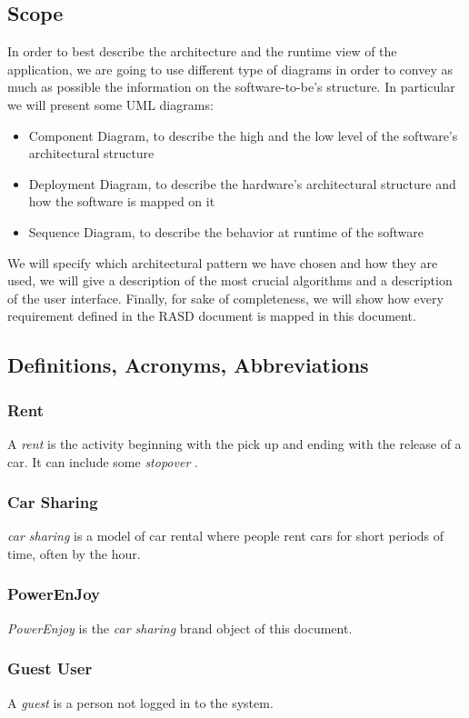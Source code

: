\documentclass[english]{article}
\newcommand{\rent}{\textit{rent }}
\newcommand{\carsharing}{\textit {car sharing }}
\newcommand{\powerenjoy}{\textit{PowerEnjoy }}
\newcommand{\stopover}{\textit{stopover }}
\newcommand{\guest}{\textit{guest }}
\begin{document}
	\subsection{Scope}
		In order to best describe the architecture and the runtime view of the application, we are going to use different type of diagrams in order to convey as much as possible the information on the software-to-be's structure.
		In particular we will present some UML diagrams:
			\begin{itemize}
				\item{Component Diagram, to describe the high and the low level of the software's architectural structure}
				\item{Deployment Diagram, to describe the hardware's architectural structure and how the software is mapped on it}
				\item{Sequence Diagram, to describe the behavior at runtime of the software}
			\end{itemize}
		 We will specify which architectural pattern we have chosen and how they are used, we will give a description of the most crucial algorithms and a description of the user interface. Finally, for sake of completeness, we will show how every requirement defined in the RASD document is mapped in this document.
	\subsection{Definitions, Acronyms, Abbreviations}
		\subsubsection{Rent}
			A \rent is the activity beginning with the pick up and ending with the release of a car. It can include some \stopover.
		\subsubsection{Car Sharing}
			\carsharing is a model of car rental where people rent cars for short periods of time, often by the hour.
		\subsubsection{PowerEnJoy}
			\powerenjoy is the \carsharing brand object of this document.
		\subsubsection{Guest User}
			A \guest is a person not logged in to the system.
\end{document}
